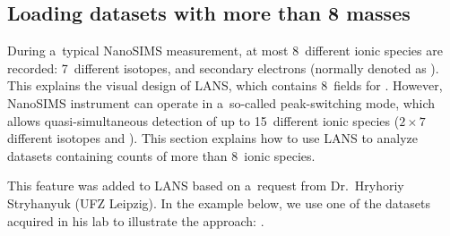 \subsection{Loading datasets with more than 8 masses}
\setcounter{step}{0}

\goldbox{}
During a~typical NanoSIMS measurement, at most 8~different ionic species are recorded: 7~different isotopes, and secondary electrons (normally denoted as ). This explains the visual design of LANS, which contains 8~fields for . However, NanoSIMS instrument can operate in a~so-called peak-switching mode, which allows quasi-simultaneous detection of up to 15~different ionic species ($2\times 7$ different isotopes and ). This section explains how to use LANS to analyze datasets containing counts of more than 8~ionic species.
\tcbe

\noindent
This feature was added to LANS based on a~request from Dr.~Hryhoriy Stryhanyuk (UFZ Leipzig). In the example below, we use one of the datasets acquired in his lab to illustrate the approach: .

\baselineskip





